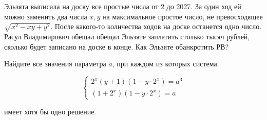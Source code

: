 Эльзята выписала на доску все простые числа от 2 до 2027. За один ход ей можно заменить два числа $x, y$ на максимальное простое число, не превосходящее $\sqrt{x^2-xy+y^2}$. После какого-то количества ходов на доске останется одно число. Расул Владимирович обещал обещал Эльзяте заплатить столько тысяч рублей, сколько будет записано на доске в конце. Как Эльзяте обанкротить РВ?

Найдите все значения параметра $a$, при каждом из которых система

$$
\left\{\begin{array}{l}
    2^x(y+1)\left(1-y \cdot 2^x\right)=a^3 \\
    \left(1+2^x\right)\left(1-y \cdot 2^x\right)=a
\end{array}\right.
$$

имеет хотя бы одно решение.

